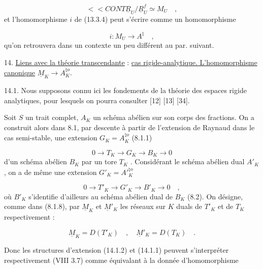 
\begin{equation}\tag{13.5.12}
<<CONT \underline{R}_U/\underline{R}^{f}_{U} \simeq M_U \quad ,
\end{equation}
et l'homomorphisme $i$ de (13.3.4) peut s'écrire comme un homomorphisme

\begin{equation}\tag{13.5.13}
i : M_U \longrightarrow A^{\natural} \quad ,
\end{equation}
qu'on retrouvera dans un contexte un peu différent au par. suivant.


14. \underline{Liens avec la théorie transcendante} : \underline{cas rigide-analytique. L'homomorphisme canonique} $\underline{M}_K \longrightarrow A_K^{\natural o}$.

14.1. Nous supposons connu ici les fondements de la théorie des espaces rigide  analytiques, pour lesquels on pourra consulter [12] [13] [34].

Soit $S$ un trait complet, $A_K$ un schéma abélien sur son corps des fractions. On a construit alors dans 8.1, par descente à partir de l'extension de Raynaud dans le cas semi-stable, une extension $G_K = A_K^{\natural o}$ (8.1.1)

\begin{equation}\tag{14.1.1}
0 \longrightarrow T_K \longrightarrow G_K \longrightarrow B_K \longrightarrow 0
\end{equation}
d'un schéma abélien $B_K$ par un tore $T_K$ . Considérant le schéma abélien dual $A'_K$ , on a de même une extension $G'_K = A'{}^{\natural o}_{K}$

\begin{equation}\tag{14.1.2}
0 \longrightarrow T'_K \longrightarrow G'_K \longrightarrow B'_K \longrightarrow 0 \quad ,
\end{equation}
où $B'_K$ s'identifie d'ailleurs au schéma abélien dual de $B_K$ (8.2). On désigne, comme dans (8.1.8), par $\underline{M}_K$ et $\underline{M}'_K$ les réseaux sur $K$ duals de $T'_K$ et de $T_K$ respectivement :

\begin{equation}\tag{14.1.3}
\underline{M}_K = D(T'_K) \quad , \quad \underline{M}'_K = D(T_K) \quad .
\end{equation}


Donc les structures d'extension (14.1.2) et (14.1.1) peuvent s'interpréter respectivement (VIII 3.7) comme équivalant à la donnée d'homomorphisme

